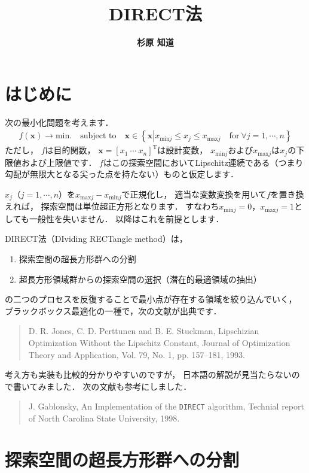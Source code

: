 ﻿\documentclass{jsarticle}
\title{\bf DIRECT法}
\author{\Large{\bf 杉原 知道}}
\begin{document}
\maketitle

\section{はじめに}

次の最小化問題を考えます．
\begin{align*}
f(\bm{x})\rightarrow\mbox{min.}\quad\mbox{subject to}\quad \bm{x}\in\left\{
\bm{x}\left|
x_{\mathrm{min}j}\leq x_{j}\leq x_{\mathrm{max}j}\quad\mbox{for}~\forall j=1,\cdots,n
\right.\right\}
\end{align*}
ただし，
$f$は目的関数，
$\bm{x}=[x_{1}~\cdots~x_{n}]^{\mathrm{T}}$は設計変数，
$x_{\mathrm{min}j}$および$x_{\mathrm{max}j}$は$x_{j}$の下限値および上限値です．
$f$はこの探索空間においてLipschitz連続である（つまり勾配が無限大となる尖った点を持たない）ものと仮定します．

$x_{j}$（$j=1,\cdots,n$）を$x_{\mathrm{max}j}-x_{\mathrm{min}j}$で正規化し，
適当な変数変換を用いて$f$を置き換えれば，
探索空間は単位超正方形となります．
すなわち$x_{\mathrm{min}j}=0$，$x_{\mathrm{max}j}=1$としても一般性を失いません．
以降はこれを前提とします．

DIRECT法（DIviding RECTangle method）は，
\begin{enumerate}
\item{探索空間の超長方形群への分割}
\item{超長方形領域群からの探索空間の選択（潜在的最適領域の抽出）}
\end{enumerate}
の二つのプロセスを反復することで最小点が存在する領域を絞り込んでいく，
ブラックボックス最適化の一種で，次の文献が出典です．
\begin{quote}
D. R. Jones, C. D. Perttunen and B. E. Stuckman,
Lipschizian Optimization Without the Lipschitz Constant,
Journal of Optimization Theory and Application, Vol. 79, No. 1, pp. 157--181, 1993.
\end{quote}
考え方も実装も比較的分かりやすいのですが，
日本語の解説が見当たらないので書いてみました．
次の文献も参考にしました．
\begin{quote}
J. Gablonsky, An Implementation of the {\tt DIRECT} algorithm, Technial report of North Carolina State University, 1998.
\end{quote}



\section{探索空間の超長方形群への分割}
\end{document}
